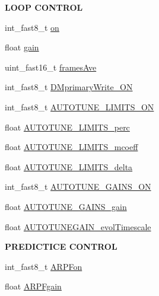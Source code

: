 \begin{Indent}{\bf L\+O\+O\+P C\+O\+N\+T\+R\+O\+L}\par
\begin{DoxyCompactItemize}
\item 
int\+\_\+fast8\+\_\+t \hyperlink{structAOLOOPCONTROL__CONF_aae0614696c6b57d88dca70938d74fde1}{on}
\item 
float \hyperlink{structAOLOOPCONTROL__CONF_acf3d0a55c37a60451e4eff487c94bdf7}{gain}
\item 
uint\+\_\+fast16\+\_\+t \hyperlink{structAOLOOPCONTROL__CONF_a832db85f5873c001309ed59c5faf327a}{frames\+Ave}
\item 
int\+\_\+fast8\+\_\+t \hyperlink{structAOLOOPCONTROL__CONF_ae36d4218f3ab7284a86c59f81b3df14b}{D\+Mprimary\+Write\+\_\+\+O\+N}
\item 
int\+\_\+fast8\+\_\+t \hyperlink{structAOLOOPCONTROL__CONF_a2739a060aa7904c34c99bb09126d26a1}{A\+U\+T\+O\+T\+U\+N\+E\+\_\+\+L\+I\+M\+I\+T\+S\+\_\+\+O\+N}
\item 
float \hyperlink{structAOLOOPCONTROL__CONF_a28b90a598660478809c29663276df4b2}{A\+U\+T\+O\+T\+U\+N\+E\+\_\+\+L\+I\+M\+I\+T\+S\+\_\+perc}
\item 
float \hyperlink{structAOLOOPCONTROL__CONF_a71af5c2f3a1e19bcaab7bf41032b2ae1}{A\+U\+T\+O\+T\+U\+N\+E\+\_\+\+L\+I\+M\+I\+T\+S\+\_\+mcoeff}
\item 
float \hyperlink{structAOLOOPCONTROL__CONF_a6148977963c6b27ba96cccca6d2de9a1}{A\+U\+T\+O\+T\+U\+N\+E\+\_\+\+L\+I\+M\+I\+T\+S\+\_\+delta}
\item 
int\+\_\+fast8\+\_\+t \hyperlink{structAOLOOPCONTROL__CONF_ad4368b30a7fb6681bd9a0debc7eb97d5}{A\+U\+T\+O\+T\+U\+N\+E\+\_\+\+G\+A\+I\+N\+S\+\_\+\+O\+N}
\item 
float \hyperlink{structAOLOOPCONTROL__CONF_a3c66f11135ea8339f28acc18e6e03726}{A\+U\+T\+O\+T\+U\+N\+E\+\_\+\+G\+A\+I\+N\+S\+\_\+gain}
\item 
float \hyperlink{structAOLOOPCONTROL__CONF_adc02a9b7dddf3abe80be9c853087ccbe}{A\+U\+T\+O\+T\+U\+N\+E\+G\+A\+I\+N\+\_\+evol\+Timescale}
\end{DoxyCompactItemize}
\end{Indent}
\begin{Indent}{\bf P\+R\+E\+D\+I\+C\+T\+I\+C\+E C\+O\+N\+T\+R\+O\+L}\par
\begin{DoxyCompactItemize}
\item 
int\+\_\+fast8\+\_\+t \hyperlink{structAOLOOPCONTROL__CONF_aff46e62022161fa8b59ee4b37249c525}{A\+R\+P\+Fon}
\item 
float \hyperlink{structAOLOOPCONTROL__CONF_ae7bce3dfa55cd6b4b188931e57e95bc2}{A\+R\+P\+Fgain}
\end{DoxyCompactItemize}
\end{Indent}
